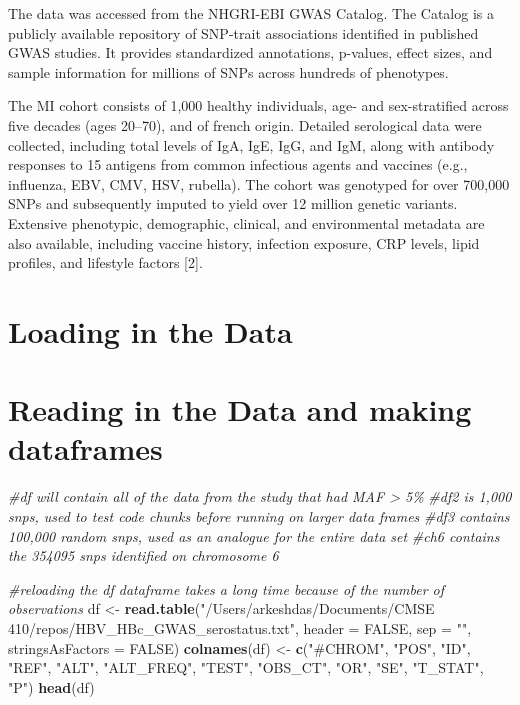 \documentclass[
  12pt,
]{article}
\newenvironment{Shaded}{\begin{snugshade}}{\end{snugshade}}
\newcommand{\AttributeTok}[1]{\textcolor[rgb]{0.13,0.29,0.53}{#1}}
\newcommand{\CommentTok}[1]{\textcolor[rgb]{0.56,0.35,0.01}{\textit{#1}}}
\newcommand{\ConstantTok}[1]{\textcolor[rgb]{0.56,0.35,0.01}{#1}}
\newcommand{\FunctionTok}[1]{\textcolor[rgb]{0.13,0.29,0.53}{\textbf{#1}}}
\newcommand{\NormalTok}[1]{#1}
\newcommand{\OtherTok}[1]{\textcolor[rgb]{0.56,0.35,0.01}{#1}}
\newcommand{\StringTok}[1]{\textcolor[rgb]{0.31,0.60,0.02}{#1}}
\begin{document}
The data was accessed from the NHGRI-EBI GWAS Catalog. The Catalog is a
publicly available repository of SNP-trait associations identified in
published GWAS studies. It provides standardized annotations, p-values,
effect sizes, and sample information for millions of SNPs across
hundreds of phenotypes.

The MI cohort consists of 1,000 healthy individuals, age- and
sex-stratified across five decades (ages 20--70), and of french origin.
Detailed serological data were collected, including total levels of IgA,
IgE, IgG, and IgM, along with antibody responses to 15 antigens from
common infectious agents and vaccines (e.g., influenza, EBV, CMV, HSV,
rubella). The cohort was genotyped for over 700,000 SNPs and
subsequently imputed to yield over 12 million genetic variants.
Extensive phenotypic, demographic, clinical, and environmental metadata
are also available, including vaccine history, infection exposure, CRP
levels, lipid profiles, and lifestyle factors {[}2{]}.

\section{Loading in the Data}\label{loading-in-the-data}

\section{Reading in the Data and making
dataframes}\label{reading-in-the-data-and-making-dataframes}

\begin{Shaded}
\begin{Highlighting}[]
\CommentTok{\#df will contain all of the data from the study that had MAF \textgreater{} 5\%}
\CommentTok{\#df2 is 1,000 snps, used to test code chunks before running on larger data frames}
\CommentTok{\#df3 contains 100,000 random snps, used as an analogue for the entire data set}
\CommentTok{\#ch6 contains the 354095 snps identified on chromosome 6}

\CommentTok{\#reloading the \textquotesingle{}df\textquotesingle{} dataframe takes a long time because of the number of observations }
\NormalTok{df }\OtherTok{\textless{}{-}} \FunctionTok{read.table}\NormalTok{(}\StringTok{"/Users/arkeshdas/Documents/CMSE 410/repos/HBV\_HBc\_GWAS\_serostatus.txt"}\NormalTok{, }\AttributeTok{header =} \ConstantTok{FALSE}\NormalTok{, }\AttributeTok{sep =} \StringTok{""}\NormalTok{, }\AttributeTok{stringsAsFactors =} \ConstantTok{FALSE}\NormalTok{)}
\FunctionTok{colnames}\NormalTok{(df) }\OtherTok{\textless{}{-}} \FunctionTok{c}\NormalTok{(}\StringTok{"\#CHROM"}\NormalTok{, }\StringTok{"POS"}\NormalTok{, }\StringTok{"ID"}\NormalTok{, }\StringTok{"REF"}\NormalTok{, }\StringTok{"ALT"}\NormalTok{, }\StringTok{"ALT\_FREQ"}\NormalTok{, }\StringTok{"TEST"}\NormalTok{, }\StringTok{"OBS\_CT"}\NormalTok{, }\StringTok{"OR"}\NormalTok{, }\StringTok{"SE"}\NormalTok{, }\StringTok{"T\_STAT"}\NormalTok{, }\StringTok{"P"}\NormalTok{)}
\FunctionTok{head}\NormalTok{(df)}
\end{Highlighting}
\end{Shaded}
\end{document}
